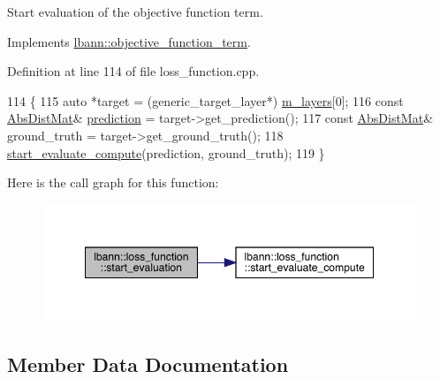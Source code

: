 Start evaluation of the objective function term. 

Implements \hyperlink{classlbann_1_1objective__function__term_a0af4dfd71fb30e43d1ae7611172ad9b0}{lbann\+::objective\+\_\+function\+\_\+term}.



Definition at line 114 of file loss\+\_\+function.\+cpp.


\begin{DoxyCode}
114                                      \{
115   \textcolor{keyword}{auto} *target = (generic\_target\_layer*) \hyperlink{classlbann_1_1objective__function__term_a9269cf0a237eacd1e220ba2739f44334}{m\_layers}[0];
116   \textcolor{keyword}{const} \hyperlink{base_8hpp_a9a697a504ae84010e7439ffec862b470}{AbsDistMat}& \hyperlink{base_8hpp_a2781a159088df64ed7d47cc91c4dc0a8ac41b9ec75e920b610e8907e066074b30}{prediction} = target->get\_prediction();
117   \textcolor{keyword}{const} \hyperlink{base_8hpp_a9a697a504ae84010e7439ffec862b470}{AbsDistMat}& ground\_truth = target->get\_ground\_truth();
118   \hyperlink{classlbann_1_1loss__function_a0bbe41060d788dc7a29f3737761a6f7d}{start\_evaluate\_compute}(prediction, ground\_truth);
119 \}
\end{DoxyCode}
Here is the call graph for this function\+:\nopagebreak
\begin{figure}[H]
\begin{center}
\leavevmode
\includegraphics[width=349pt]{classlbann_1_1loss__function_a90f4126b0b4d47838ef3cc154c6d9705_cgraph}
\end{center}
\end{figure}


\subsection{Member Data Documentation}
\mbox{\label{classlbann_1_1loss__function_ac6ac9f8f2cef7a4daa1b282dba914975}} 
